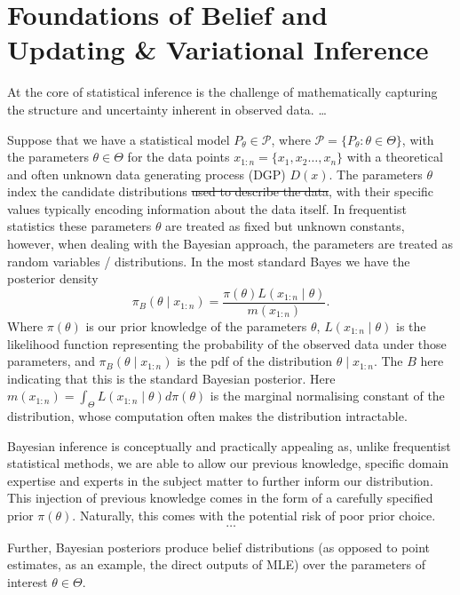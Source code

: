 \documentclass[11pt,a4paper]{article}
\newcommand{\dele}[1]{{\color{gray}\sout{#1}}}
\begin{document}
\section{Foundations of Belief and Updating \& Variational Inference}


At the core of statistical inference is the challenge of mathematically capturing the structure and uncertainty inherent in observed data. \dots

Suppose that we have a statistical model $P_\theta \in \mathcal{P}$, where $\mathcal{P} = \{P_\theta : \theta \in \Theta\}$, with the parameters $\theta \in \Theta$ for the data points $x_{1:n} = \{x_1, x_2 \dots, x_n\}$ with a theoretical and often unknown data generating process (DGP) $D(x)$.
The parameters $\theta$ index the candidate distributions \dele{used to describe the data}, with their specific values typically encoding information about the data itself.
In frequentist statistics these parameters $\theta$ are treated as fixed but unknown constants, however, when dealing with the Bayesian approach, the parameters are treated as random variables / distributions. In the most standard Bayes we have the posterior density $$\pi_B(\theta \mid x_{1:n}) = \frac{\pi(\theta) L(x_{1:n}\mid\theta)}{m(x_{1:n})}\text{.}$$
Where $\pi(\theta)$ is our prior knowledge of the parameters $\theta$, $L(x_{1:n} \mid \theta)$ is the likelihood function representing the probability of the observed data under those parameters, and $\pi_B(\theta \mid x_{1:n})$ is the pdf of the distribution $\theta \mid x_{1:n}$. The $B$ here indicating that this is the standard Bayesian posterior. Here $m(x_{1:n}) = \int_{\Theta} L(x_{1:n} \mid \theta) d\pi(\theta)$ is the marginal normalising constant of the distribution, whose computation often makes the distribution intractable.

Bayesian inference is conceptually and practically appealing as, unlike frequentist statistical methods, we are able to allow our previous knowledge, specific domain expertise and experts in the subject matter to further inform our distribution. This injection of previous knowledge comes in the form of a carefully specified prior $\pi(\theta)$. Naturally, this comes with the potential risk of poor prior choice. $$\dots$$

Further, Bayesian posteriors produce belief distributions (as opposed to point estimates, as an example, the direct outputs of MLE) over the parameters of interest $\theta \in \Theta$.
\end{document}
